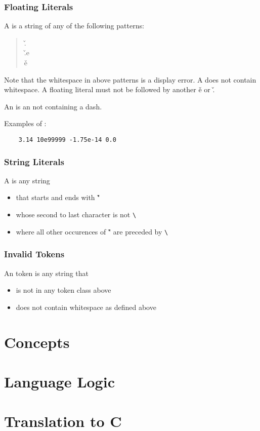 \documentclass{article}
\begin{document}
\subsubsection{Floating Literals}
A \tfl is a string of any of the following patterns:
\begin{quote}
    \tint\v.\tuint\\
    \tint\v.\tuint e\tint\\
    \tint\v e\tint
\end{quote}
Note that the whitespace in above patterns is 
a display error. A \tfl does not contain whitespace.
A floating literal must not be followed by another \v e or \v.

An \tuint is an \tint not containing a dash.

Examples of \tfl:
\begin{verbatim}
    3.14 10e99999 -1.75e-14 0.0
\end{verbatim}

\fi
\subsubsection{String Literals}
A \tstr is any string
\begin{itemize}
    \item that starts and ends with \v"
    \item whose second to last character is not \verb$\$
    \item where all other occurences of \v" are preceded by \verb$\$
\end{itemize}
\subsubsection{Invalid Tokens}
An \tinv token is any string that
\begin{itemize}
    \item is not in any token class above
    \item does not contain whitespace as defined above
\end{itemize}

\section{Concepts}
\section{Language Logic}
\section{Translation to C}
\end{document}
